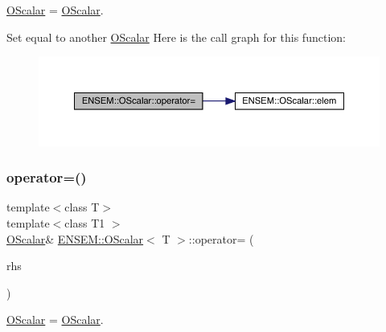 \mbox{\hyperlink{classENSEM_1_1OScalar}{O\+Scalar}} = \mbox{\hyperlink{classENSEM_1_1OScalar}{O\+Scalar}}. 

Set equal to another \mbox{\hyperlink{classENSEM_1_1OScalar}{O\+Scalar}} Here is the call graph for this function\+:
\nopagebreak
\begin{figure}[H]
\begin{center}
\leavevmode
\includegraphics[width=350pt]{da/d80/classENSEM_1_1OScalar_a7c36649387edf21f3fa19f9ae63d4aca_cgraph}
\end{center}
\end{figure}
\mbox{\label{classENSEM_1_1OScalar_aa6400023b45eed547bcb84c395fa1520}} 
\subsubsection{\texorpdfstring{operator=()}{operator=()}\hspace{0.1cm}{\footnotesize\ttfamily [10/12]}}
{\footnotesize\ttfamily template$<$class T$>$ \\
template$<$class T1 $>$ \\
\mbox{\hyperlink{classENSEM_1_1OScalar}{O\+Scalar}}\& \mbox{\hyperlink{classENSEM_1_1OScalar}{E\+N\+S\+E\+M\+::\+O\+Scalar}}$<$ T $>$\+::operator= (\begin{DoxyParamCaption}\item[{const \mbox{\hyperlink{classENSEM_1_1OScalar}{O\+Scalar}}$<$ T1 $>$ \&}]{rhs }\end{DoxyParamCaption})\hspace{0.3cm}{\ttfamily [inline]}}



\mbox{\hyperlink{classENSEM_1_1OScalar}{O\+Scalar}} = \mbox{\hyperlink{classENSEM_1_1OScalar}{O\+Scalar}}. 

